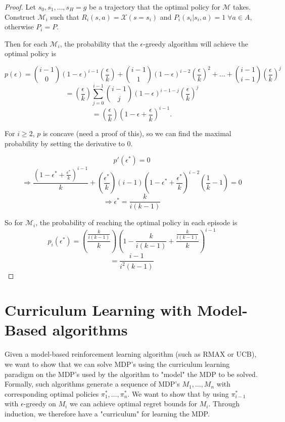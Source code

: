 \documentclass[12pt, letterpaper]{article}
\theoremstyle{definition}
\theoremstyle{remark}
\begin{document}
\begin{proof}[Proof]
    Let \(s_0, s_1, \ldots, s_H = g\) be a trajectory that the optimal policy for \(\mathcal{M}\) takes.
    Construct \(\mathcal{M}_i\) such that \(R_i(s, a) = \mathcal{X}(s = s_i)\) and \(P_i(s_i | s_i, a) = 1 \; \forall a \in A\), otherwise \(P_i = P\).

    Then for each \(\mathcal{M}_i\), the probability that the \(\epsilon\)-greedy algorithm will achieve the optimal policy is

    \[p(\epsilon) = {i-1 \choose 0} (1-\epsilon)^{i-1}(\frac{\epsilon}{k}) + {i-1 \choose 1}(1-\epsilon)^{i-2}(\frac{\epsilon}{k})^2 + \ldots + {i-1 \choose i-1} (\frac{\epsilon}{k})^j\]
    \[= (\frac{\epsilon}{k})\sum_{j=0}^{i-1}{i-1 \choose j} (1-\epsilon)^{i-1-j}(\frac{\epsilon}{k})^{j}\]
    \[= (\frac{\epsilon}{k})(1-\epsilon + \frac{\epsilon}{k})^{i-1}.\]

    For \(i \geq 2\), \(p\) is concave (need a proof of this), so we can find the maximal probability by setting the derivative to 0.

    \[p'(\epsilon^*) = 0\]
    \[\Rightarrow \frac{(1-\epsilon^* + \frac{\epsilon^*}{k})^{i-1}}{k} + (\frac{\epsilon^*}{k})(i-1)(1 - \epsilon^* + \frac{\epsilon^*}{k})^{i-2}(\frac{1}{k}-1) = 0\]
    \[\Rightarrow \epsilon^* = \frac{k}{i(k-1)}\]

    So for \(\mathcal{M}_i\), the probability of reaching the optimal policy in each episode is
    \[p_i(\epsilon^*) = (\frac{\frac{k}{i(k-1)}}{k})(1 - \frac{k}{i(k-1)} + \frac{\frac{k}{i(k-1)}}{k})^{i-1}\]
    \[= \frac{i-1}{i^2(k-1)}\]

\end{proof}

\section{Curriculum Learning with Model-Based algorithms}

Given a model-based reinforcement learning algorithm (such as RMAX or UCB), we want to show that we can solve MDP's using the curriculum learning paradigm on the MDP's used by the algorithm to "model" the MDP to be solved. Formally, such algorithms generate a sequence of MDP's \(M_1, \ldots, M_n\) with corresponding optimal policies \(\pi^*_1, \ldots, \pi^*_n\). We want to show that by using \(\pi^*_{i-1}\) with \(\epsilon\)-greedy on \(M_i\) we can achieve optimal regret bounds for \(M_i\). Through induction, we therefore have a "curriculum" for learning the MDP.
\end{document}
